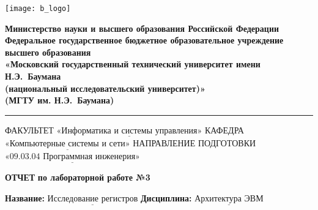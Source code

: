 \documentclass[a4paper,12pt]{article}
\begin{document}
\thispagestyle{empty}

\noindent \begin{minipage}{0.15\textwidth}
	\texttt{[image: b\_logo]}
\end{minipage}
\noindent\begin{minipage}{0.9\textwidth}\centering
	\textbf{Министерство науки и высшего образования Российской Федерации}\\
	\textbf{Федеральное государственное бюджетное образовательное учреждение высшего образования}\\
	\textbf{«Московский государственный технический университет имени Н.Э.~Баумана}\\
	\textbf{(национальный исследовательский университет)»}\\
	\textbf{(МГТУ им. Н.Э.~Баумана)}
\end{minipage}

\noindent\rule{18cm}{3pt}
\newline\newline
\noindent ФАКУЛЬТЕТ $\underline{\text{«Информатика и системы управления»}}$ \newline\newline
\noindent КАФЕДРА $\underline{\text{«Компьютерные системы и сети»}}$\newline\newline
\noindent НАПРАВЛЕНИЕ ПОДГОТОВКИ $\underline{\text{«09.03.04 Программная инженерия»}}$\newline\newline\newline\newline\newline


\begin{center}
	\noindent\begin{minipage}{1.3\textwidth}\centering
	\Large\textbf{  ОТЧЕТ }\newline
	\textbf{по лабораторной работе №3}\newline\newline
	\end{minipage}
\end{center}

\noindent\textbf{Название:} $\underline{\text{Исследование регистров}}$\newline\newline
\noindent\textbf{Дисциплина:} $\underline{\text{Архитектура ЭВМ}}$\newline\newline\newline\newline\newline
\end{document}

